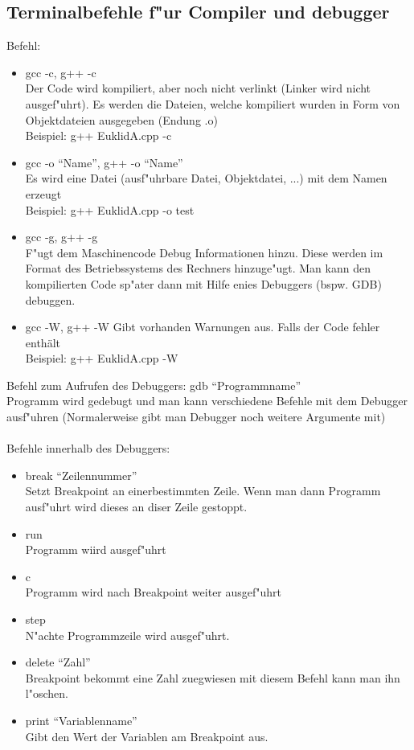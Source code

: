 \documentclass[a4paper,11pt,titlepage]{article}
\begin{document}
\subsection{Terminalbefehle f"ur Compiler und debugger}
Befehl:
\begin{itemize}
\item gcc -c, g++ -c \\
Der Code wird kompiliert, aber noch nicht verlinkt (Linker wird nicht ausgef"uhrt). Es werden die Dateien, welche kompiliert wurden in Form von Objektdateien ausgegeben (Endung .o)\\
Beispiel:  g++ EuklidA.cpp -c
\item gcc -o "`Name"', g++ -o "`Name"'\\
Es wird eine Datei (ausf"uhrbare Datei, Objektdatei, ...) mit dem Namen erzeugt\\
Beispiel: g++ EuklidA.cpp -o test
\item gcc -g, g++ -g\\
F"ugt dem Maschinencode Debug Informationen hinzu. Diese werden im Format des Betriebssystems des Rechners hinzuge"ugt. Man kann den kompilierten Code sp"ater dann mit Hilfe enies Debuggers (bspw. GDB) debuggen.
\item gcc -W, g++ -W
Gibt vorhanden Warnungen aus. Falls der Code fehler enthält\\
Beispiel: g++ EuklidA.cpp -W
\end{itemize}
Befehl zum Aufrufen des Debuggers:
gdb "`Programmname"' \\
Programm wird gedebugt und man kann verschiedene Befehle mit dem Debugger ausf"uhren (Normalerweise gibt man Debugger noch weitere Argumente mit)\\
\\
Befehle innerhalb des Debuggers:
\begin{itemize}
\item break "`Zeilennummer"'\\
Setzt Breakpoint an einerbestimmten Zeile.  Wenn man dann Programm ausf"uhrt wird dieses an diser Zeile gestoppt.
\item run\\
Programm wiird ausgef"uhrt
\item c\\
Programm wird nach Breakpoint weiter ausgef"uhrt
\item step\\
N"achte Programmzeile wird ausgef"uhrt.
\item delete "`Zahl"'\\
Breakpoint bekommt eine Zahl zuegwiesen mit diesem Befehl kann man ihn l"oschen.\\
\item print "`Variablenname"'\\
Gibt den Wert der Variablen am Breakpoint aus.
\end{itemize}
\end{document}
